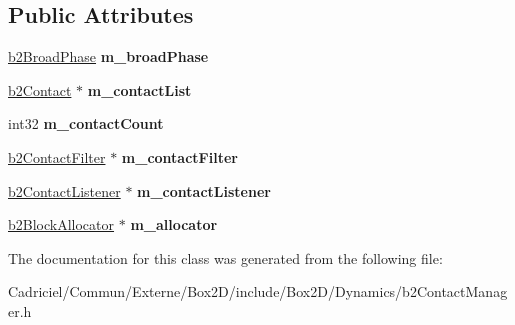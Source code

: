\subsection*{Public Attributes}
\begin{DoxyCompactItemize}
\item 
\hyperlink{classb2_broad_phase}{b2\+Broad\+Phase} {\bfseries m\+\_\+broad\+Phase}\hypertarget{classb2_contact_manager_af85a9c7b0fb138b9fb635dbcf3b0b482}{}\label{classb2_contact_manager_af85a9c7b0fb138b9fb635dbcf3b0b482}

\item 
\hyperlink{classb2_contact}{b2\+Contact} $\ast$ {\bfseries m\+\_\+contact\+List}\hypertarget{classb2_contact_manager_aaca5f490daffabd29f7ad809921224b3}{}\label{classb2_contact_manager_aaca5f490daffabd29f7ad809921224b3}

\item 
int32 {\bfseries m\+\_\+contact\+Count}\hypertarget{classb2_contact_manager_a115b2f9bf38ffd045b26ae91ea696288}{}\label{classb2_contact_manager_a115b2f9bf38ffd045b26ae91ea696288}

\item 
\hyperlink{classb2_contact_filter}{b2\+Contact\+Filter} $\ast$ {\bfseries m\+\_\+contact\+Filter}\hypertarget{classb2_contact_manager_accf0e9232b9eeff002220ecb8d37a17f}{}\label{classb2_contact_manager_accf0e9232b9eeff002220ecb8d37a17f}

\item 
\hyperlink{classb2_contact_listener}{b2\+Contact\+Listener} $\ast$ {\bfseries m\+\_\+contact\+Listener}\hypertarget{classb2_contact_manager_ac3565501f5ab42323050712b244bfe9a}{}\label{classb2_contact_manager_ac3565501f5ab42323050712b244bfe9a}

\item 
\hyperlink{classb2_block_allocator}{b2\+Block\+Allocator} $\ast$ {\bfseries m\+\_\+allocator}\hypertarget{classb2_contact_manager_a20c57f602aa349239df715de5294821d}{}\label{classb2_contact_manager_a20c57f602aa349239df715de5294821d}

\end{DoxyCompactItemize}


The documentation for this class was generated from the following file\+:\begin{DoxyCompactItemize}
\item 
Cadriciel/\+Commun/\+Externe/\+Box2\+D/include/\+Box2\+D/\+Dynamics/b2\+Contact\+Manager.\+h\end{DoxyCompactItemize}

